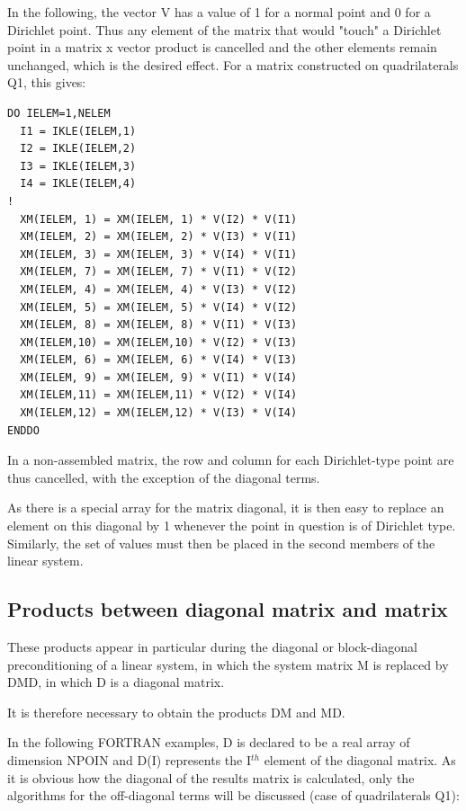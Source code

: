 In the following, the vector V has a value of 1 for a normal point and 0 for a
Dirichlet point. Thus any element of the matrix that would "touch" a Dirichlet
point in a matrix x vector product is cancelled and the other elements remain
unchanged, which is the desired effect. For a matrix constructed on
quadrilaterals Q1, this gives:

\begin{lstlisting}[language=TelFortran]
DO IELEM=1,NELEM
  I1 = IKLE(IELEM,1)
  I2 = IKLE(IELEM,2)
  I3 = IKLE(IELEM,3)
  I4 = IKLE(IELEM,4)
!
  XM(IELEM, 1) = XM(IELEM, 1) * V(I2) * V(I1)
  XM(IELEM, 2) = XM(IELEM, 2) * V(I3) * V(I1)
  XM(IELEM, 3) = XM(IELEM, 3) * V(I4) * V(I1)
  XM(IELEM, 7) = XM(IELEM, 7) * V(I1) * V(I2)
  XM(IELEM, 4) = XM(IELEM, 4) * V(I3) * V(I2)
  XM(IELEM, 5) = XM(IELEM, 5) * V(I4) * V(I2)
  XM(IELEM, 8) = XM(IELEM, 8) * V(I1) * V(I3)
  XM(IELEM,10) = XM(IELEM,10) * V(I2) * V(I3)
  XM(IELEM, 6) = XM(IELEM, 6) * V(I4) * V(I3)
  XM(IELEM, 9) = XM(IELEM, 9) * V(I1) * V(I4)
  XM(IELEM,11) = XM(IELEM,11) * V(I2) * V(I4)
  XM(IELEM,12) = XM(IELEM,12) * V(I3) * V(I4)
ENDDO
\end{lstlisting}

In a non-assembled matrix, the row and column for each Dirichlet-type point are
thus cancelled, with the exception of the diagonal terms.

As there is a special array for the matrix diagonal, it is then easy to replace
an element on this diagonal by 1 whenever the point in question is of Dirichlet
type. Similarly, the set of values must then be placed in the second members of
the linear system.

\subsection{Products between diagonal matrix and matrix}

These products appear in particular during the diagonal or block-diagonal
preconditioning of a linear system, in which the system matrix M is replaced by
DMD, in which D is a diagonal matrix.

It is therefore necessary to obtain the products DM and MD.

In the following FORTRAN examples, D is declared to be a real array of
dimension NPOIN and D(I) represents the I${}^{th}$ element of the diagonal
matrix. As it is obvious how the diagonal of the results matrix is calculated,
only the algorithms for the off-diagonal terms will be discussed (case of
quadrilaterals Q1):

